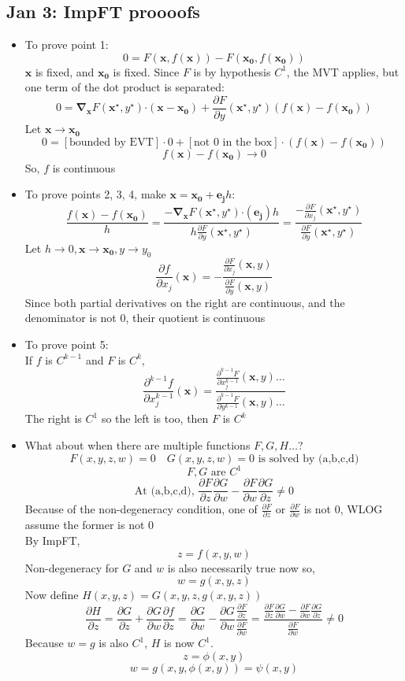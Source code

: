 \documentclass[10pt, oneside]{article}
\newcommand{\del}{\partial}
\newcommand{\Cdot}{\boldsymbol{\cdot}}
\renewcommand{\vec}[1]{\mathbf{#1}}
\begin{document}
\subsection{Jan 3: ImpFT proooofs}
\begin{itemize}
    \item To prove point 1:
        \[0 = F(\vec{x},f(\vec{x})) - F(\vec{x_0},f(\vec{x_0}))\]
        $\vec{x}$ is fixed, and $\vec{x_0}$ is fixed. Since $F$ is by hypothesis $C^1$, the MVT applies, but one term of the dot product is separated:
        \[0 = \vec{\nabla}_\vec{x} F(\vec{x^\star},y^\star) \Cdot (\vec{x} - \vec{x_0}) + \frac{\del F}{\del y} (\vec{x^\star},y^\star) (f(\vec{x}) - f(\vec{x_0}))\]
        Let $\vec{x} \rightarrow \vec{x_0}$
        \[0 = [\text{bounded by EVT}] \cdot 0 + [\text{not 0 in the box}] \cdot (f(\vec{x}) - f(\vec{x_0}))\]
        \[f(\vec{x}) - f(\vec{x_0}) \rightarrow 0\]
        So, $f$ is continuous
    \item To prove points 2, 3, 4, make $\vec{x} = \vec{x_0} + \vec{e_j}h$:
        \[\frac{f(\vec{x}) - f(\vec{x_0})}{h} = \frac{- \vec{\nabla}_\vec{x} F(\vec{x^\star}, y^\star) \Cdot (\vec{e_j}) h}{h \frac{\del F}{\del y} (\vec{x^\star},y^\star)} = \frac{- \frac{\del F}{\del x_j} (\vec{x^\star}, y^\star)}{\frac{\del F}{\del y} (\vec{x^\star},y^\star)}\]
        Let $h \rightarrow 0, \vec{x} \rightarrow \vec{x_0}, y \rightarrow y_0$
        \[\frac{\del f}{\del x_j} (\vec{x}) = -\frac{\frac{\del F}{\del x_j} (\vec{x},y)}{\frac{\del F}{\del y}(\vec{x},y)}\]
        Since both partial derivatives on the right are continuous, and the denominator is not $0$, their quotient is continuous
    \item To prove point 5:\\
        If $f$ is $C^{k-1}$ and $F$ is $C^k$,
        \[\frac{\del^{k-1} f}{\del x_j^{k-1}} (\vec{x}) = \frac{\frac{\del^{k-1} F}{\del x_j^{k-1}} (\vec{x},y) \hdots}{\frac{\del^{k-1} F}{\del y^{k-1}}(\vec{x},y) \hdots}\]
        The right is $C^1$ so the left is too, then $F$ is $C^k$ 
    \item What about when there are multiple functions $F,G,H\hdots$? 
        \[F(x,y,z,w) = 0 \quad G(x,y,z,w) = 0 \text{ is solved by (a,b,c,d)}\]
        \[F, G \text{ are } C^1\]
        \[\text{At (a,b,c,d), } \frac{\del F}{\del z} \frac{\del G}{\del w} - \frac{\del F}{\del w} \frac{\del G}{\del z} \neq 0\]
        Because of the non-degeneracy condition, one of $\frac{\del F}{\del z}$ or $\frac{\del F}{\del w}$ is not $0$, WLOG assume the former is not $0$\\
        By ImpFT,
        \[z = f(x,y,w)\]
        Non-degeneracy for $G$ and $w$ is also necessarily true now so,
        \[w = g(x,y,z)\]
        Now define $H(x,y,z) = G(x,y,z,g(x,y,z))$
        \[\frac{\del H}{\del z} = \frac{\del G}{\del z} + \frac{\del G}{\del w}\frac{\del f}{\del z } = \frac{\del G}{\del w} - \frac{\del G}{\del w} \frac{\frac{\del F}{\del z}}{\frac{\del F}{\del w}} = \frac{\frac{\del F}{\del z} \frac{\del G}{\del w} - \frac{\del F}{\del w} \frac{\del G}{\del z}}{\frac{\del F}{\del w}} \neq 0\]
        Because $w = g$ is also $C^1$, $H$ is now $C^1$.
        \[z = \phi(x,y)\]
        \[w = g(x,y,\phi(x,y)) = \psi(x,y)\]
\end{itemize}
\end{document}
